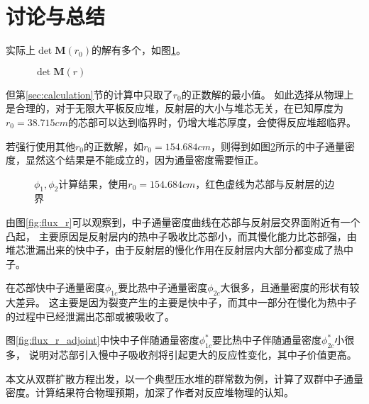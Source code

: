 \section{讨论与总结}
\label{sec:discussion}

实际上$\det \pmb{M}(r_0)$的解有多个，如图\ref{fig:det_M_r_far}。

\begin{figure}[H]
    \centering
    
    \caption{$\det \pmb{M}(r)$}
    \label{fig:det_M_r_far}
\end{figure}

但第\ref{sec:calculation}节的计算中只取了$r_0$的正数解的最小值。
如此选择从物理上是合理的，对于无限大平板反应堆，反射层的大小与堆芯无关，在已知厚度为$r_0=38.715\si{cm}$的芯部可以达到临界时，仍增大堆芯厚度，会使得反应堆超临界。

若强行使用其他$r_0$的正数解，如$r_0=154.684\si{cm}$，则得到如图\ref{fig:flux_r_far}所示的中子通量密度，显然这个结果是不能成立的，因为通量密度需要恒正。

\begin{figure}[H]
    \centering
    
    \caption{$\phi_1,\phi_2$计算结果，使用$r_0=154.684\si{cm}$，红色虚线为芯部与反射层的边界}
    \label{fig:flux_r_far}
\end{figure}

由图\ref{fig:flux_r}可以观察到，中子通量密度曲线在芯部与反射层交界面附近有一个凸起，
主要原因是反射层内的热中子吸收比芯部小，而其慢化能力比芯部强，由堆芯泄漏出来的快中子，由于反射层的慢化作用在反射层内大部分都变成了热中子。

在芯部快中子通量密度$\phi_{1c}$要比热中子通量密度$\phi_{2c}$大很多，且通量密度的形状有较大差异。
这主要是因为裂变产生的主要是快中子，而其中一部分在慢化为热中子的过程中已经泄漏出芯部或被吸收了。

图\ref{fig:flux_r_adjoint}中快中子伴随通量密度$\phi^*_{1c}$要比热中子伴随通量密度$\phi^*_{2c}$小很多，
说明对芯部引入慢中子吸收剂将引起更大的反应性变化，其中子价值更高。

本文从双群扩散方程出发，以一个典型压水堆的群常数为例，计算了双群中子通量密度。计算结果符合物理预期，加深了作者对反应堆物理的认知。
